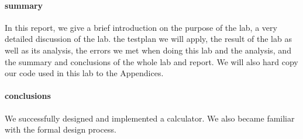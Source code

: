 \paragraph{summary} In this report, we give a brief introduction on the purpose of the lab, a very detailed discussion of the lab. the testplan we will apply, the result of the lab as well as its
analysis, the errors we met when doing this lab and the analysis, and the summary and conclusions of the whole lab and report. We will also hard copy our code used in this lab to the Appendices.

\paragraph{conclusions} We successfully designed and implemented a calculator. We also became familiar with the formal design process.
